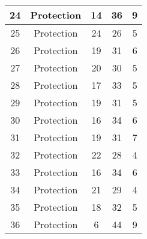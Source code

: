 \documentclass[results.tex]{subfiles}
\begin{document}
\begin{center}
\begin{tabular}{| c || c | c | c | c |}
            \hline
            24                      & Protection                   & 14                     & 36                      & 9                    \\
            \hline
            25                      & Protection                   & 24                     & 26                      & 5                    \\
            \hline
            26                      & Protection                   & 19                     & 31                      & 6                    \\
            \hline
            27                      & Protection                   & 20                     & 30                      & 5                    \\
            \hline
            28                      & Protection                   & 17                     & 33                      & 5                    \\
            \hline
            29                      & Protection                   & 19                     & 31                      & 5                    \\
            \hline
            30                      & Protection                   & 16                     & 34                      & 6                    \\
            \hline
            31                      & Protection                   & 19                     & 31                      & 7                    \\
            \hline
            32                      & Protection                   & 22                     & 28                      & 4                    \\
            \hline
            33                      & Protection                   & 16                     & 34                      & 6                    \\
            \hline
            34                      & Protection                   & 21                     & 29                      & 4                    \\
            \hline
            35                      & Protection                   & 18                     & 32                      & 5                    \\
            \hline
            36                      & Protection                   & 6                      & 44                      & 9                    \\

\end{tabular}
\end{center}
\end{document}
